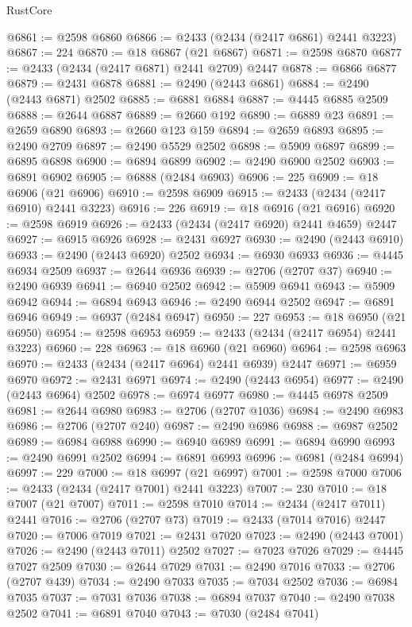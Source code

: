 \begin{lexlean}{RustCore}
\begin{coremodule}
@6861 := @2598 @6860
@6866 := @2433 (@2434 (@2417 @6861) @2441 @3223)
@6867 := 224
@6870 := @18 @6867 (@21 @6867)
@6871 := @2598 @6870
@6877 := @2433 (@2434 (@2417 @6871) @2441 @2709) @2447
@6878 := @6866 @6877
@6879 := @2431 @6878
@6881 := @2490 (@2443 @6861)
@6884 := @2490 (@2443 @6871) @2502
@6885 := @6881 @6884
@6887 := @4445 @6885 @2509
@6888 := @2644 @6887
@6889 := @2660 @192
@6890 := @6889 @23
@6891 := @2659 @6890
@6893 := @2660 @123 @159
@6894 := @2659 @6893
@6895 := @2490 @2709
@6897 := @2490 @5529 @2502
@6898 := @5909 @6897
@6899 := @6895 @6898
@6900 := @6894 @6899
@6902 := @2490 @6900 @2502
@6903 := @6891 @6902
@6905 := @6888 (@2484 @6903)
@6906 := 225
@6909 := @18 @6906 (@21 @6906)
@6910 := @2598 @6909
@6915 := @2433 (@2434 (@2417 @6910) @2441 @3223)
@6916 := 226
@6919 := @18 @6916 (@21 @6916)
@6920 := @2598 @6919
@6926 := @2433 (@2434 (@2417 @6920) @2441 @4659) @2447
@6927 := @6915 @6926
@6928 := @2431 @6927
@6930 := @2490 (@2443 @6910)
@6933 := @2490 (@2443 @6920) @2502
@6934 := @6930 @6933
@6936 := @4445 @6934 @2509
@6937 := @2644 @6936
@6939 := @2706 (@2707 @37)
@6940 := @2490 @6939
@6941 := @6940 @2502
@6942 := @5909 @6941
@6943 := @5909 @6942
@6944 := @6894 @6943
@6946 := @2490 @6944 @2502
@6947 := @6891 @6946
@6949 := @6937 (@2484 @6947)
@6950 := 227
@6953 := @18 @6950 (@21 @6950)
@6954 := @2598 @6953
@6959 := @2433 (@2434 (@2417 @6954) @2441 @3223)
@6960 := 228
@6963 := @18 @6960 (@21 @6960)
@6964 := @2598 @6963
@6970 := @2433 (@2434 (@2417 @6964) @2441 @6939) @2447
@6971 := @6959 @6970
@6972 := @2431 @6971
@6974 := @2490 (@2443 @6954)
@6977 := @2490 (@2443 @6964) @2502
@6978 := @6974 @6977
@6980 := @4445 @6978 @2509
@6981 := @2644 @6980
@6983 := @2706 (@2707 @1036)
@6984 := @2490 @6983
@6986 := @2706 (@2707 @240)
@6987 := @2490 @6986
@6988 := @6987 @2502
@6989 := @6984 @6988
@6990 := @6940 @6989
@6991 := @6894 @6990
@6993 := @2490 @6991 @2502
@6994 := @6891 @6993
@6996 := @6981 (@2484 @6994)
@6997 := 229
@7000 := @18 @6997 (@21 @6997)
@7001 := @2598 @7000
@7006 := @2433 (@2434 (@2417 @7001) @2441 @3223)
@7007 := 230
@7010 := @18 @7007 (@21 @7007)
@7011 := @2598 @7010
@7014 := @2434 (@2417 @7011) @2441
@7016 := @2706 (@2707 @73)
@7019 := @2433 (@7014 @7016) @2447
@7020 := @7006 @7019
@7021 := @2431 @7020
@7023 := @2490 (@2443 @7001)
@7026 := @2490 (@2443 @7011) @2502
@7027 := @7023 @7026
@7029 := @4445 @7027 @2509
@7030 := @2644 @7029
@7031 := @2490 @7016
@7033 := @2706 (@2707 @439)
@7034 := @2490 @7033
@7035 := @7034 @2502
@7036 := @6984 @7035
@7037 := @7031 @7036
@7038 := @6894 @7037
@7040 := @2490 @7038 @2502
@7041 := @6891 @7040
@7043 := @7030 (@2484 @7041)

\end{coremodule}
\end{lexlean}
